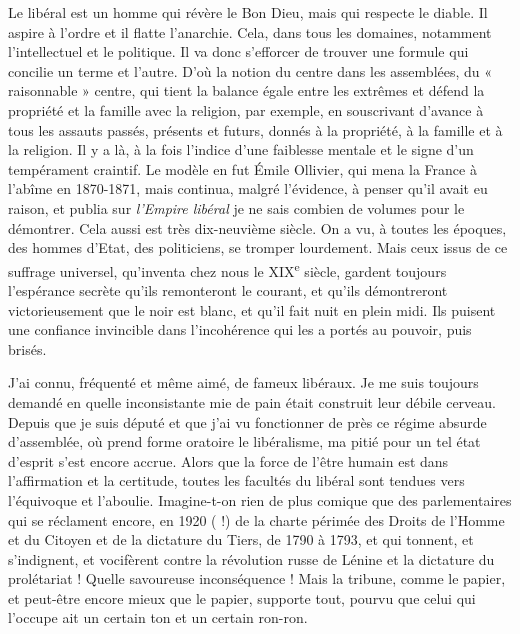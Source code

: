 \documentclass[french,twoside]{book} %
\begin{document}
Le libéral est un homme qui révère le Bon Dieu, mais qui respecte le diable. Il aspire à l’ordre et il flatte l’anarchie. Cela, dans tous les domaines, notamment l’intellectuel et le politique. Il va donc s’efforcer de trouver une formule qui concilie un terme et l’autre. D’où la notion du centre dans les assemblées, du « raisonnable » centre, qui tient la balance égale entre les extrêmes et défend la propriété et la famille avec la religion, par exemple, en souscrivant d’avance à tous les assauts passés, présents et futurs, donnés à la propriété, à la famille et à la religion. Il y a là, à la fois l’indice d’une faiblesse mentale et le signe d’un tempérament craintif. Le modèle en fut Émile Ollivier, qui mena la France à l’abîme en 1870-1871, mais continua, malgré l’évidence, à penser qu’il avait eu raison, et publia sur {\itshape l’Empire libéral} je ne sais combien de volumes pour le démontrer. Cela aussi est très dix-neuvième siècle. On a vu, à toutes les époques, des hommes d’Etat, des politiciens, se tromper lourdement. Mais ceux issus de ce suffrage universel, qu’inventa chez nous le XIX\textsuperscript{e} siècle, gardent toujours l’espérance secrète qu’ils remonteront le courant, et qu’ils démontreront victorieusement que le noir est blanc, et qu’il fait nuit en plein midi. Ils puisent une confiance invincible dans l’incohérence qui les a portés au pouvoir, puis brisés.\par
J’ai connu, fréquenté et même aimé, de fameux libéraux. Je me suis toujours demandé en quelle inconsistante mie de pain était construit leur débile cerveau. Depuis que je suis député et que j’ai vu fonctionner de près ce régime absurde d’assemblée, où prend forme oratoire le libéralisme, ma pitié pour un tel état d’esprit s’est encore accrue. Alors que la force de l’être humain est dans l’affirmation et la certitude, toutes les facultés du libéral sont tendues vers l’équivoque et l’aboulie. Imagine-t-on rien de plus comique que des parlementaires qui se réclament encore, en 1920 ( !) de la charte périmée des Droits de l’Homme et du Citoyen et de la dictature du Tiers, de 1790 à 1793, et qui tonnent, et s’indignent, et vocifèrent contre la révolution russe de Lénine et la dictature du prolétariat ! Quelle savoureuse inconséquence ! Mais la tribune, comme le papier, et peut-être encore mieux que le papier, supporte tout, pourvu que celui qui l’occupe ait un certain ton et un certain ron-ron.\par
\end{document}
